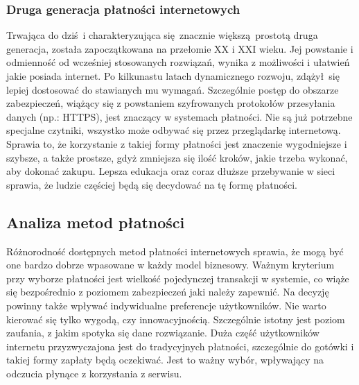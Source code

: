 \subsubsection*{Druga generacja płatności internetowych}

Trwająca do dziś i charakteryzująca się znacznie większą prostotą druga generacja, została zapoczątkowana na przełomie XX i XXI wieku. Jej powstanie i odmienność od wcześniej stosowanych rozwiązań, wynika z możliwości i ułatwień jakie posiada internet. Po kilkunastu latach dynamicznego rozwoju, zdążył się lepiej dostosować do stawianych mu wymagań. Szczególnie postęp do obszarze zabezpieczeń, wiążący się z powstaniem szyfrowanych protokołów przesyłania danych (np.: HTTPS), jest znaczący w systemach płatności. Nie są już potrzebne specjalne czytniki, wszystko może odbywać się przez przeglądarkę internetową. Sprawia to, że korzystanie z takiej formy płatności jest znaczenie wygodniejsze i szybsze, a także prostsze, gdyż zmniejsza się ilość kroków, jakie trzeba wykonać, aby dokonać zakupu. Lepsza edukacja oraz coraz dłuższe przebywanie w sieci sprawia, że ludzie częściej będą się decydować na tę formę płatności.  


\subsection{Analiza metod płatności}

Różnorodność dostępnych metod płatności internetowych sprawia, że mogą być one bardzo dobrze wpasowane w każdy model biznesowy. Ważnym kryterium przy wyborze płatności jest wielkość pojedynczej transakcji w systemie, co wiąże się bezpośrednio z poziomem zabezpieczeń jaki należy zapewnić. Na decyzję powinny także wpływać indywidualne preferencje użytkowników. Nie warto kierować się tylko wygodą, czy innowacyjnością. Szczególnie istotny jest poziom zaufania, z jakim spotyka się dane rozwiązanie. Duża część użytkowników internetu przyzwyczajona jest do tradycyjnych płatności, szczególnie do gotówki i takiej formy zapłaty będą oczekiwać. Jest to ważny wybór, wpływający na odczucia płynące z korzystania z serwisu.

